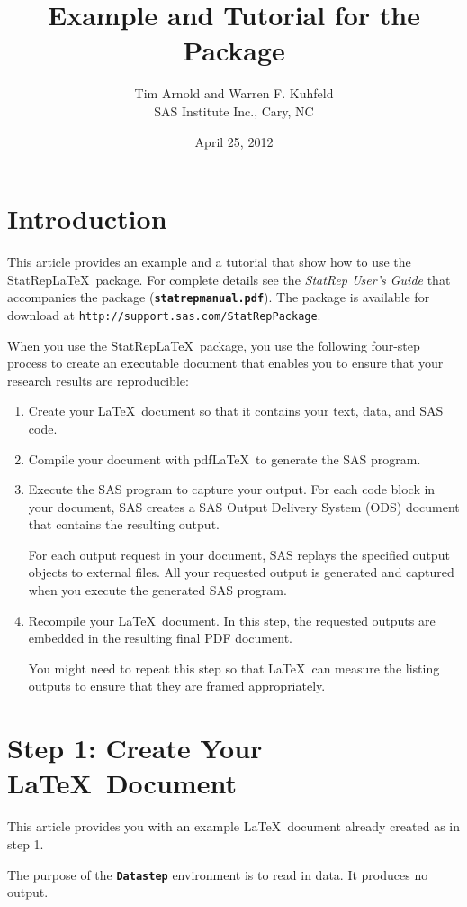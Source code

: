 \documentclass{article}
\title{Example and Tutorial for the \Statrep Package}
\author{Tim Arnold and Warren F. Kuhfeld\\SAS Institute Inc., Cary, NC}
\date{April 25, 2012}
\newcommand*{\Statrep}{\mbox{\textsf{StatRep}}\xspace}
\newcommand*{\Code}[1]{\texttt{\textbf{#1}}}
\begin{document}
\maketitle
\section{Introduction}
This article provides an example and a
tutorial that show how to use the \Statrep \LaTeX\ package. 
For complete details 
see the \emph{\Statrep User's Guide} that accompanies the 
package (\Code{statrepmanual.pdf}). The package is available 
for download at \texttt{http://support.sas.com/StatRepPackage}.

When you use the \Statrep \LaTeX\ package, you use the following
four-step process to create an executable document that 
enables you to ensure that your research results are reproducible:
\begin{enumerate}
\item Create your \LaTeX\ document so that it contains your text,
data, and SAS code.

\item Compile your document with pdf\LaTeX\ to generate the SAS
program.

\item Execute the SAS program to capture your output. For each
code block in your document, SAS creates a SAS Output Delivery System (ODS)
document that contains the resulting output. 

For each output request in your document, SAS replays the 
specified output objects to external files. All your
requested output is generated and captured when you execute 
the generated SAS program.

\item Recompile your \LaTeX\ document. In this step, the
requested outputs are embedded in the resulting final PDF document.

You might need to repeat this step so that \LaTeX\ can measure the
listing outputs to ensure that they are framed appropriately.
\end{enumerate}

\section{Step 1: Create Your \LaTeX\ Document}
This article provides you with an example \LaTeX\ document
already created as in step 1.

The purpose of the \Code{Datastep} environment is to read in data. 
It produces no output.
\end{document}
